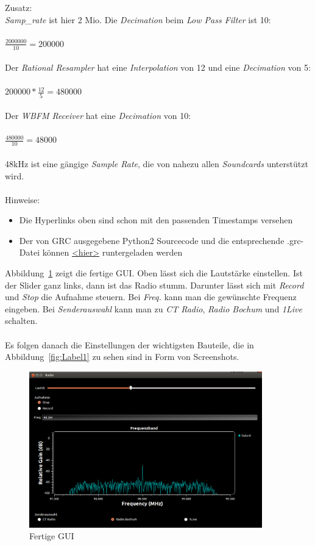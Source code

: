 \documentclass[12pt,a4paper]{article}
\begin{document}
Zusatz:\\
\textit{Samp\_rate} ist hier 2 Mio. Die 
\textit{Decimation} beim \textit{Low Pass Filter} ist 10:\\\\
$\frac{2 000 000}{10}= 200 000$\\\\
Der \textit{Rational Resampler} hat eine \textit{Interpolation} 
von 12 und eine \textit{Decimation} von 5:\\~\\
$200 000 * \frac{12}{5}= 480 000$\\\\
Der \textit{WBFM Receiver} hat eine \textit{Decimation} von 10:\\\\
$\frac{480 000}{10}= 48 000$\\~\\
48kHz ist eine gängige \textit{Sample Rate}, die von nahezu allen 
\textit{Soundcards} unterstützt wird.\\~\\

Hinweise:
\begin{itemize}
	\item Die Hyperlinks oben sind schon mit den passenden 
	Timestamps versehen
	\item Der von GRC ausgegebene Python2 Sourcecode 
	und die entsprechende .grc-Datei können 
	\href{https://mega.nz/file/Dgwz1TJK#Ij82qKY9ne4je0WJau5FlC7m422H0vi4gds5uQJ7J0s}
	{<hier>} runtergeladen werden
\end{itemize} 

Abbildung~\ref{fig:Label2} zeigt die fertige GUI. Oben lässt sich 
die Lautstärke einstellen. Ist der Slider ganz links, dann ist das 
Radio stumm. Darunter lässt sich mit \textit{Record} und 
\textit{Stop} die Aufnahme steuern. Bei \textit{Freq.} kann man 
die gewünschte Frequenz eingeben. Bei \textit{Senderauswahl} kann
man zu \textit{CT Radio}, \textit{Radio Bochum} und \textit{1Live}
schalten. \\\\
Es folgen danach die Einstellungen der wichtigsten Bauteile, 
die in  Abbildung~\ref{fig:Label1} zu sehen sind in Form 
von Screenshots.


\begin{figure}[hbt!]
\centering
	\includegraphics[width=0.9\textwidth ]
	{Bilder/Aufgabe1-gui.png}
	\caption{Fertige GUI}
	\label{fig:Label2}
\end{figure}
\end{document}
